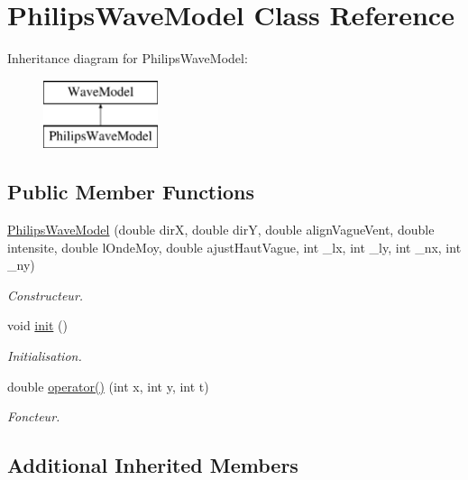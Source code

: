\hypertarget{class_philips_wave_model}{}\section{Philips\+Wave\+Model Class Reference}
\label{class_philips_wave_model}
Inheritance diagram for Philips\+Wave\+Model\+:\begin{figure}[H]
\begin{center}
\leavevmode
\includegraphics[height=2.000000cm]{class_philips_wave_model}
\end{center}
\end{figure}
\subsection*{Public Member Functions}
\begin{DoxyCompactItemize}
\item 
\hyperlink{class_philips_wave_model_af74356970392e267473590564dfaa4f2}{Philips\+Wave\+Model} (double dirX, double dirY, double align\+Vague\+Vent, double intensite, double l\+Onde\+Moy, double ajust\+Haut\+Vague, int \+\_\+lx, int \+\_\+ly, int \+\_\+nx, int \+\_\+ny)
\begin{DoxyCompactList}\small\item\em Constructeur. \end{DoxyCompactList}\item 
void \hyperlink{class_philips_wave_model_acbd7477d35df750bcd83d8c680eabb83}{init} ()
\begin{DoxyCompactList}\small\item\em Initialisation. \end{DoxyCompactList}\item 
double \hyperlink{class_philips_wave_model_aaefa659dbc00e44430e244a03f2f45ec}{operator()} (int x, int y, int t)
\begin{DoxyCompactList}\small\item\em Foncteur. \end{DoxyCompactList}\end{DoxyCompactItemize}
\subsection*{Additional Inherited Members}


